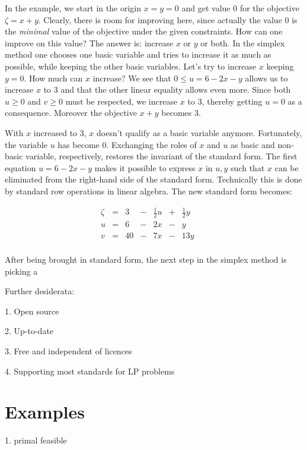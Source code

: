 \documentclass[ukenglish]{nik}
\begin{document}
In the example, we start in the origin $x=y=0$ and get
value 0 for the objective $\zeta = x + y$.
Clearly, there is room for improving here, since actually 
the value 0 is the \emph{minimal} value of the objective
under the given constraints. How can one improve on this
value? The answer is: increase $x$ or $y$ or both.
In the simplex method one chooses one basic variable and
tries to increase it as much as possible, while keeping the
other basic variables.
Let's try to increase $x$ keeping $y=0$. How much can $x$ increase?
We see that $0 \leq u = 6 -2x-y$ allows us to increase $x$ to $3$
and that the other linear equality allows even more. Since both
$u\geq 0$ and $v\geq 0$ must be respected, we increase $x$ to $3$,
thereby getting $u=0$ as a consequence. Moreover the objective $x+y$ becomes 3.

With $x$ increased to 3, $x$ doesn't qualify as a basic variable anymore.
Fortunately, the variable $u$ has become 0. Exchanging the roles of
$x$ and $u$ as basic and non-basic variable, respectively, restores 
the invariant of the standard form. The first equation $u = 6 -2x-y$ makes it
possible to express $x$ in $u,y$ such that $x$ can be eliminated from the
right-hand side of the standard form. Technically this is done by standard
row operations in linear algebra. The new standard form becomes:

\[    
    \begin{array}{lcrcrcrcr}
      \zeta&=& 3 &-& \frac{1}{2} u &+& \frac{1}{2} y & &  \\\hline
      u    &=& 6 &-&   2 x &-&     y & &  \\
      v    &=& 40&-&   7 x &-&  13 y & &  \\

    \end{array}
\]
 



After being brought in standard form, the next step in the simplex
method is picking a 


Further desiderata:

1. Open source

2. Up-to-date

3. Free and independent of licences

4. Supporting most standards for LP problems

\section{Examples}
1. primal feasible
\end{document}
